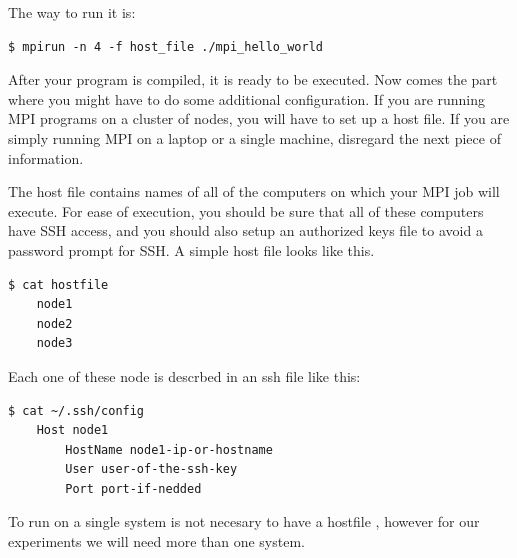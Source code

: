 The way to run it is: 

\begin{minipage}{\textwidth}
\end{minipage}

\begin{minipage}{\textwidth}
\begin{lstlisting}[frame=single]
  $ mpirun -n 4 -f host_file ./mpi_hello_world
\end{lstlisting}
\end{minipage}

After your program is compiled, it is ready to be executed. Now comes the part
where you might have to do some additional configuration. If you are running
MPI programs on a cluster of nodes, you will have to set up a host file. If you
are simply running MPI on a laptop or a single machine, disregard the next
piece of information.

The host file contains names of all of the computers on which your MPI job will
execute. For ease of execution, you should be sure that all of these computers
have SSH access, and you should also setup an authorized keys file to avoid a
password prompt for SSH. A simple host file looks like this.

\begin{minipage}{\textwidth}
\end{minipage}

\begin{minipage}{\textwidth}
\begin{lstlisting}[frame=single]
  $ cat hostfile
    node1
    node2
    node3
\end{lstlisting}
\end{minipage}

Each one of these node is descrbed in an ssh file like this:

\begin{minipage}{\textwidth}
\end{minipage}

\begin{minipage}{\textwidth}

\begin{lstlisting}[frame=single]
  $ cat ~/.ssh/config
    Host node1
        HostName node1-ip-or-hostname
        User user-of-the-ssh-key
        Port port-if-nedded
\end{lstlisting}

\end{minipage}

To run on a single system is not necesary to have a hostfile , however for our
experiments we will need more than one system.

